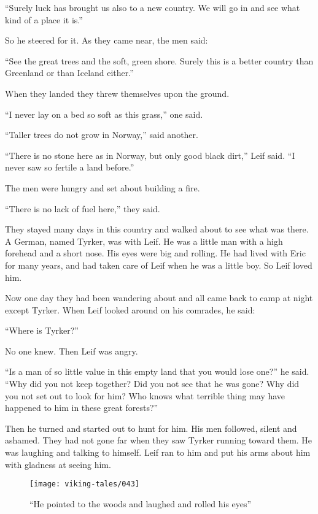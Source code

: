 ``Surely luck has brought us also to a new country. We will go in and
see what kind of a place it is.''

So he steered for it. As they came near, the men said:

``See the great trees and the soft, green shore. Surely this is a better
country than Greenland or than Iceland either.''

When they landed they threw themselves upon the ground.

``I never lay on a bed so soft as this grass,'' one said.

``Taller trees do not grow in Norway,'' said another.

``There is no stone here as in Norway, but only good black dirt,'' Leif
said. ``I never saw so fertile a land before.''

The men were hungry and set about building a fire.

``There is no lack of fuel here,'' they said.

They stayed many days in this country and walked about to see what was
there. A German, named Tyrker, was with Leif. He was a little man with a
high forehead and a short nose. His eyes were big and rolling. He had
lived with Eric for many years, and had taken care of Leif when he was a
little boy. So Leif loved him.

Now one day they had been wandering about and all came back to camp at
night except Tyrker. When Leif looked around on his comrades, he said:

``Where is Tyrker?''

No one knew. Then Leif was angry.

``Is a man of so little value in this empty land that you would lose
one?'' he said. ``Why did you not keep together? Did you not see that he
was gone? Why did you not set out to look for him? Who knows what
terrible thing may have happened to him in these great forests?''

Then he turned and started out to hunt for him. His men followed, silent
and ashamed. They had not gone far when they saw Tyrker running toward
them. He was laughing and talking to himself. Leif ran to him and put
his arms about him with gladness at seeing him.

\begin{figure}
    \centering
    \texttt{[image: viking-tales/043]}
    \caption{``He pointed to the woods and laughed and rolled his eyes''}
\end{figure}

